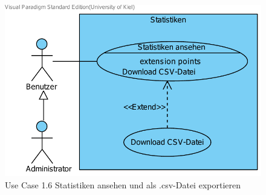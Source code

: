 \documentclass[10pt,a4paper]{article}
\begin{document}
        \begin{figure}[H]
	\centering
	  \includegraphics[width=\linewidth]{gfx/webseite/statistikfunktion.pdf}
          \caption{Use Case 1.6 Statistiken ansehen und als .csv-Datei exportieren}
	\end{figure}
        
\end{document}
